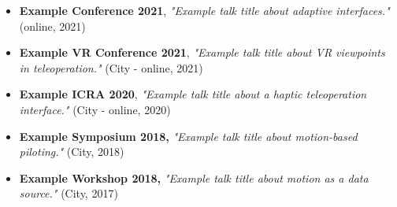 \documentclass[9pt]{extarticle}
\newcommand{\bulletFont}{\fontsize{10}{13.8}\selectfont}
\begin{document}
\vspace{6pt}
{\bulletFont
\begin{itemize}[itemsep=5pt]
\item \textbf{Example Conference 2021}, \emph{"Example talk title about adaptive interfaces."} (online, 2021)
\item \textbf{Example VR Conference 2021}, \emph{"Example talk title about VR viewpoints in teleoperation."} (City - online, 2021)
\item \textbf{Example ICRA 2020}, \emph{"Example talk title about a haptic teleoperation interface."} (City - online, 2020)
\item \textbf{Example Symposium 2018,} \emph{"Example talk title about motion-based piloting."} (City, 2018)
\item \textbf{Example Workshop 2018,} \emph{"Example talk title about motion as a data source."} (City, 2017)
\end{itemize}
}
\end{document}
